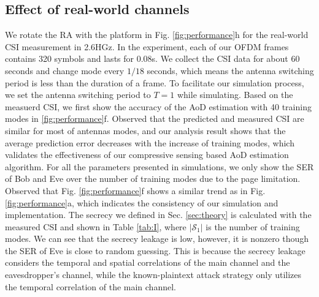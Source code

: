 \subsection{Effect of real-world channels}
We rotate the RA with the platform in Fig. \ref{fig:performance}h for the real-world CSI measurement in 2.6HGz. In the experiment, each of our OFDM frames contains 320 symbols and lasts for 0.08s. We collect the CSI data for about 60 seconds and change mode every $1/18$ seconds, which means the antenna switching period is less than the duration of a frame. To facilitate our simulation process, we set the antenna switching period to $T = 1$ while simulating. Based on the measuerd CSI, we first show the accuracy of the AoD estimation with 40 training modes in \ref{fig:performance}f. Observed that the predicted and measured CSI are similar for most of antennas modes, and our analysis result shows that the average prediction error decreases with the increase of training modes, which validates the effectiveness of our compressive sensing based AoD estimation algorithm. For all the parameters presented in simulations, we only show the SER of Bob and Eve over the number of training modes due to the page limitation. Observed that Fig. \ref{fig:performance}f shows a similar trend as in Fig. \ref{fig:performance}a, which indicates the consistency of our simulation and implementation. The secrecy we defined in Sec. \ref{sec:theory} is calculated with the measured CSI and shown in Table \ref{tab:I}, where $|\mathcal{S}_1|$ is the number of training modes. We can see that the secrecy leakage is low, however, it is nonzero though the SER of Eve is close to random guessing. This is because the secrecy leakage considers the temporal and spatial correlations of the main channel and the eavesdropper's channel, while the known-plaintext attack strategy only utilizes the temporal correlation of  the main channel.